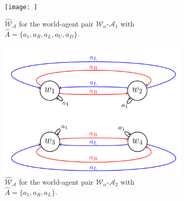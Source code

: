 {\begin{figure}[H]
  \centering
    \begin{subfigure}[b]{0.45\linewidth}
        \centering
        \texttt{[image: ]}
        \caption{
        $\hat{\mathscr{W}}_{\mathscr{A}}$ for the world-agent pair $\mathscr{W}_{\alpha}$-$\mathscr{A}_{1}$ with $\hat{A} = \{ a_{1}, a_{R}, a_{L}, a_{U}, a_{D} \}$.
        }
    \end{subfigure}
    \begin{subfigure}[b]{0.45\linewidth}
        \centering
        \includegraphics[width=\linewidth]{3Algorithm/Images/action_affect_algebra.png}
        \caption{
        $\hat{\mathscr{W}}_{\mathscr{A}}$ for the world-agent pair $\mathscr{W}_{\alpha}$-$\mathscr{A}_{2}$ with $\hat{A} = \{ a_{1}, a_{R}, a_{L} \}$.
        }
    \end{subfigure}
  \caption{
  }
\label{fig:2x2_cyclical_grid_world_wall_states}
\end{figure}

}
